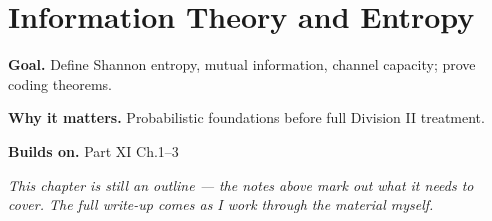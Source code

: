 \chapter{Information Theory and Entropy}
\label{ch:11-probability-theory-09}

\begin{chapterintro}
\textbf{Goal.} Define Shannon entropy, mutual information, channel capacity; prove coding theorems.

\textbf{Why it matters.} Probabilistic foundations before full Division II treatment.

\textbf{Builds on.} Part XI Ch.1–3
\end{chapterintro}

\textit{This chapter is still an outline --- the notes above mark out what it needs to cover. The full write-up comes as I work through the material myself.}
